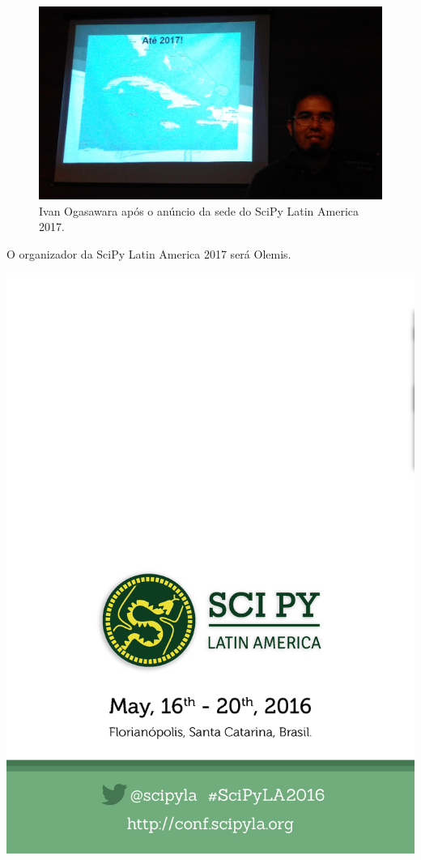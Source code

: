 \documentclass[12pt]{article}
\begin{document}
\begin{figure}[!htb]
\center
\includegraphics[height=.3\textheight]{2017.jpg}
\caption{Ivan Ogasawara após o anúncio da sede do SciPy Latin America 2017.}
\end{figure}

O organizador da SciPy Latin America 2017 será Olemis.

\clearpage
\newpage

\thispagestyle{empty}
\noindent  %
\includegraphics{../../assets/contra-capa}
\NoBgThispage
\end{document}
